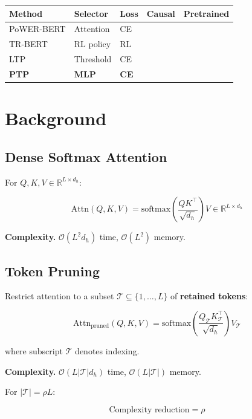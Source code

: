 \begin{table}[H]
\centering
\small
\begin{tabular}{lllll}
\toprule
\textbf{Method} & \textbf{Selector} & \textbf{Loss} & \textbf{Causal} & \textbf{Pretrained} \\
\midrule
PoWER-BERT & Attention & CE &  &  \\
TR-BERT & RL policy & RL &  &  \\
LTP & Threshold & CE &  &  \\
\textbf{PTP} & \textbf{MLP} & \textbf{CE} & \textbf{ } & \textbf{ } \\
\bottomrule
\end{tabular}
\end{table}




\section{Background}

\subsection{Dense Softmax Attention}

For $Q, K, V \in \mathbb{R}^{L \times d_h}$:

\[
\text{Attn}(Q, K, V) = \text{softmax}\!\left(\frac{Q K^\top}{\sqrt{d_h}}\right) V \in \mathbb{R}^{L \times d_h}
\tag{3.1}
\]

\textbf{Complexity.} $\mathcal{O}(L^2 d_h)$ time, $\mathcal{O}(L^2)$ memory.

\subsection{Token Pruning}

Restrict attention to a subset $\mathcal{T} \subseteq \{1, \dots, L\}$ 
of \textbf{retained tokens}:

\[
\text{Attn}_\text{pruned}(Q, K, V) = \text{softmax}\!\left(\frac{Q_\mathcal{T} K_\mathcal{T}^\top}{\sqrt{d_h}}\right) V_\mathcal{T}
\tag{3.2}
\]

where subscript $\mathcal{T}$ denotes indexing.

\textbf{Complexity.} $\mathcal{O}(L |\mathcal{T}| d_h)$ time, $\mathcal{O}(L |\mathcal{T}|)$ memory.

For $|\mathcal{T}| = \rho L$:

\[
\text{Complexity reduction} = \rho
\tag{3.3}
\]

